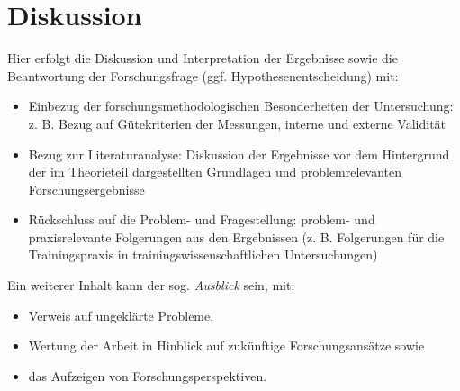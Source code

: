 \chapter{Diskussion}
Hier erfolgt die Diskussion und Interpretation der Ergebnisse sowie die Beantwortung der Forschungsfrage (ggf. Hypothesenentscheidung) mit:
\begin{itemize}
	\item Einbezug der forschungsmethodologischen Besonderheiten der Untersuchung: z. B. Bezug auf Gütekriterien der Messungen, interne und externe Validität
	\item Bezug zur Literaturanalyse: Diskussion der Ergebnisse vor dem Hintergrund der im Theorieteil dargestellten Grundlagen und problemrelevanten Forschungsergebnisse
	\item Rückschluss auf die Problem- und Fragestellung: problem- und praxisrelevante Folgerungen aus den Ergebnissen (z. B. Folgerungen für die Trainingspraxis in trainingswissenschaftlichen Untersuchungen)
\end{itemize}
Ein weiterer Inhalt kann der sog. \emph{Ausblick} sein, mit:
\begin{itemize}
	\item Verweis auf ungeklärte Probleme,
	\item Wertung der Arbeit in Hinblick auf zukünftige Forschungsansätze sowie
	\item das Aufzeigen von Forschungsperspektiven.
\end{itemize}


